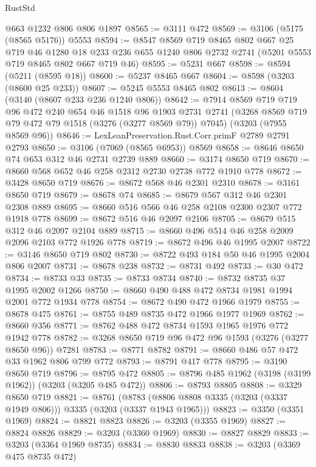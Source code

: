 \begin{lexlean}{RustStd}
\begin{coremodule}
    @663
    @1232
    @806
    @806
    @1897
@8565 := @3111 @472
@8569 := @3106 (@5175 (@8565 @5176)) @5553
@8594 := @8547
    @8569
    @719
    @8465
    @802
    @667
    @25
    @719
    @46
    @1280
    @18
    @233
    @236
    @655
    @1240
    @806
    @2732
    @2741
    (@5201 @5553 @719 @8465 @802 @667 @719 @46)
@8595 := @5231 @667
@8598 := @8594 (@5211 (@8595 @18))
@8600 := @5237 @8465 @667
@8604 := @8598 (@3203 (@8600 @25 @233))
@8607 := @5245 @5553 @8465 @802
@8613 := @8604 (@3140 (@8607 @233 @236 @1240 @806))
@8642 := @7914
    @8569
    @719
    @719
    @96
    @472
    @240
    @654
    @46
    @1518
    @96
    @1903
    @2731
    @2741
    (@3268 @8569 @719 @79 @472 @79 @1518 (@3276 (@3277 @8569 @79)) @7045)
    (@3203 (@7955 @8569 @96))
@8646 := LexLeanPreservation.Rust.Corr.primF @2789 @2791 @2793
@8650 := @3106 (@7069 (@8565 @6953)) @8569
@8658 := @8646 @8650 @74 @653 @312 @46 @2731 @2739 @889
@8660 := @3174 @8650 @719
@8670 := @8660 @568 @652 @46 @258 @2312 @2730 @2738 @772 @1910 @778
@8672 := @3428 @8650 @719
@8676 := @8672 @568 @46 @2301 @2310
@8678 := @3161 @8650 @719
@8679 := @8678 @74
@8685 := @8679 @567 @312 @46 @2301 @2308 @889
@8695 := @8660 @516 @566 @46 @258 @2108 @2300 @2307 @772 @1918 @778
@8699 := @8672 @516 @46 @2097 @2106
@8705 := @8679 @515 @312 @46 @2097 @2104 @889
@8715 := @8660 @496 @514 @46 @258 @2009 @2096 @2103 @772 @1926 @778
@8719 := @8672 @496 @46 @1995 @2007
@8722 := @3146 @8650 @719 @802
@8730 := @8722 @493 @184 @50 @46 @1995 @2004 @806 @2007
@8731 := @8678 @238
@8732 := @8731 @492
@8733 := @30 @472
@8734 := @8733 @33
@8735 := @8733 @8734
@8740 := @8732 @8735 @37 @1995 @2002 @1266
@8750 := @8660 @490 @488 @472 @8734 @1981 @1994 @2001 @772 @1934 @778
@8754 := @8672 @490 @472 @1966 @1979
@8755 := @8678 @475
@8761 := @8755 @489 @8735 @472 @1966 @1977 @1969
@8762 := @8660 @356
@8771 := @8762 @488 @472 @8734 @1593 @1965 @1976 @772 @1942 @778
@8782 := @3268 @8650 @719 @96 @472 @96 @1593 (@3276 (@3277 @8650 @96)) @7281
@8783 := @8771 @8782
@8791 := @8660 @486 @57 @472 @33 @1962 @806 @799 @772
@8793 := @8791 @417 @778
@8795 := @3190 @8650 @719
@8796 := @8795 @472
@8805 := @8796 @485 @1962 (@3198 (@3199 @1962)) (@3203 (@3205 @485 @472))
@8806 := @8793 @8805
@8808 := @3329 @8650 @719
@8821 := @8761
    (@8783 (@8806 @8808 @3335 (@3203 (@3337 @1949 @806))) @3335 (@3203 (@3337 @1943 @1965)))
@8823 := @3350 (@3351 @1969)
@8824 := @8821 @8823
@8826 := @3203 (@3355 @1969)
@8827 := @8824 @8826
@8829 := @3203 (@3360 @1969)
@8830 := @8827 @8829
@8833 := @3203 (@3364 @1969 @8735)
@8834 := @8830 @8833
@8838 := @3203 (@3369 @475 @8735 @472)

\end{coremodule}
\end{lexlean}

